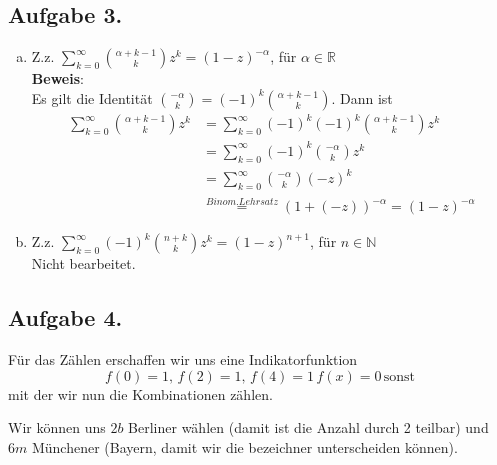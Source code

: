 \documentclass[11pt,a4paper,ngerman]{article}
\begin{document}
\subsection*{Aufgabe 3.}

\begin{enumerate}[a)]
\item Z.z. $ \sum_{k=0}^\infty \binom{\alpha +k -1}{k} z^k = (1-z)^{-\alpha} $, für $\alpha \in \mathbb{R}$ \\

\textbf{Beweis}: \\
Es gilt die Identität $\binom{-\alpha}{k} = (-1)^k \binom{\alpha + k -1}{k}$. Dann ist
\begin{equation*}\begin{split}
\sum_{k=0}^\infty \binom{\alpha +k -1}{k} z^k
&= \sum_{k=0}^\infty (-1)^k (-1)^k \binom{\alpha +k -1}{k} z^k \\
&= \sum_{k=0}^\infty (-1)^k \binom{-\alpha}{k} z^k \\
&= \sum_{k=0}^\infty \binom{-\alpha}{k} (-z)^k \\
&\stackrel{Binom.Lehrsatz}{=} (1 + (-z))^{-\alpha} = (1 - z)^{-\alpha}
\end{split}\end{equation*}
\item Z.z. $\sum_{k=0}^\infty (-1)^k \binom{n+k}{k} z^k = (1-z)^{n+1}$, für $n \in \mathbb{N}$ \\
Nicht bearbeitet.
%
\end{enumerate}

\subsection*{Aufgabe 4.}

Für das Zählen erschaffen wir uns eine Indikatorfunktion
$$
    f(0) = 1, \, f(2) = 1, \, f(4) = 1 \, f(x) = 0 \, \text{sonst}
$$
mit der wir nun die Kombinationen zählen.

Wir können uns $2b$ Berliner wählen (damit ist die Anzahl durch 2 teilbar)
und $6m$ Münchener (Bayern, damit wir die bezeichner unterscheiden können).
\end{document}
